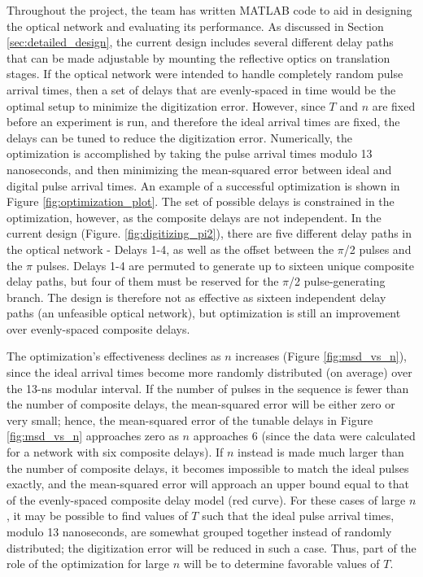 \documentclass[pdftex,12pt,a4paper]{article}
\begin{document}
Throughout the project, the team has written MATLAB code to aid in designing the optical network and evaluating its performance. As discussed in Section \ref{sec:detailed_design}, the current design includes several different delay paths that can be made adjustable by mounting the reflective optics on translation stages. If the optical network were intended to handle completely random pulse arrival times, then a set of delays that are evenly-spaced in time would be the optimal setup to minimize the digitization error. However, since $T$ and $n$ are fixed before an experiment is run, and therefore the ideal arrival times are fixed, the delays can be tuned to reduce the digitization error. Numerically, the optimization is accomplished by taking the pulse arrival times modulo 13 nanoseconds, and then minimizing the mean-squared error between ideal and digital pulse arrival times. An example of a successful optimization is shown in Figure \ref{fig:optimization_plot}. The set of possible delays is constrained in the optimization, however, as the composite delays are not independent. In the current design (Figure. \ref{fig:digitizing_pi2}), there are five different delay paths in the optical network - Delays 1-4, as well as the offset between the $\pi$/2 pulses and the $\pi$ pulses. Delays 1-4 are permuted to generate up to sixteen unique composite delay paths, but four of them must be reserved for the $\pi$/2 pulse-generating branch. The design is therefore not as effective as sixteen independent delay paths (an unfeasible optical network), but optimization is still an improvement over evenly-spaced composite delays.

The optimization's effectiveness declines as $n$ increases (Figure \ref{fig:msd_vs_n}), since the ideal arrival times become more randomly distributed (on average) over the 13-ns modular interval. If the number of pulses in the sequence is fewer than the number of composite delays, the mean-squared error will be either zero or very small; hence, the mean-squared error of the tunable delays in Figure \ref{fig:msd_vs_n} approaches zero as $n$ approaches 6 (since the data were calculated for a network with six composite delays). If $n$ instead is made much larger than the number of composite delays, it becomes impossible to match the ideal pulses exactly, and the mean-squared error will approach an upper bound equal to that of the evenly-spaced composite delay model (red curve). For these cases of large $n$, it may be possible to find values of $T$ such that the ideal pulse arrival times, modulo 13 nanoseconds, are somewhat grouped together instead of randomly distributed; the digitization error will be reduced in such a case. Thus, part of the role of the optimization for large $n$ will be to determine favorable values of $T$.
\end{document}
